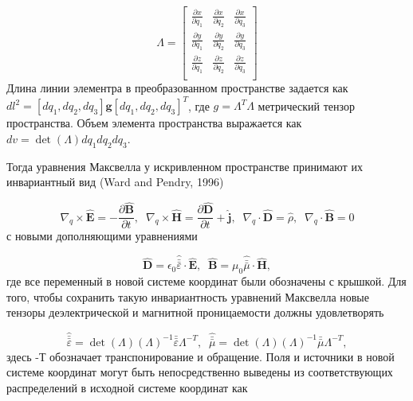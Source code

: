 \documentclass[12pt,a4paper]{article}
\begin{document}
\begin{equation}\label{e4}
	\Lambda = 
	\begin{bmatrix}
	\frac{\partial x}{\partial q_1} & \frac{\partial x}{\partial q_2} & \frac{\partial x}{\partial q_3}\\
	\frac{\partial y}{\partial q_1} & \frac{\partial y}{\partial q_2} & \frac{\partial y}{\partial q_3}\\
	\frac{\partial z}{\partial q_1} & \frac{\partial z}{\partial q_2} & \frac{\partial z}{\partial q_3}\\
	\end{bmatrix}
\end{equation}
Длина линии элементра в преобразованном пространстве задается как 
$dl^2 = [dq_1, dq_2, dq_3]\mathbf{g}[dq_1, dq_2, dq_3]^T$, где $g = \Lambda^T\Lambda$ метрический тензор
пространства. Объем элемента пространства выражается как $dv = \det(\Lambda)dq_1dq_2dq_3$.

Тогда уравнения Максвелла у искривленном пространстве принимают их инвариантный вид (Ward and Pendry, 
1996)

\begin{equation}\label{e5}
	\nabla_q \times \mathbf{\hat{E}} = -\frac{\partial \mathbf{\hat{B}}}{\partial t}, \;\;
\nabla_q \times \mathbf{\hat{H}} = \frac{\partial \mathbf{\hat{D}}}{\partial t} + \mathbf{\hat{j}}, \;\;
\nabla_q \cdot \mathbf{\hat{D}} = \hat{\rho},\;\;
\nabla_q \cdot \mathbf{\hat{B}} = 0
\end{equation}
с новыми дополняющими уравнениями

\begin{equation}\label{e6}
	\mathbf{\hat{D}} = \epsilon_0 \hat{\bar{\bar{\varepsilon}}} \cdot \mathbf{\hat{E}}, \;\;
	\mathbf{\hat{B}} = \mu_0 \hat{\bar{\bar{\mu}}} \cdot \mathbf{\hat{H}},
\end{equation}
где все переменный в новой системе координат были обозначены с крышкой. Для того, чтобы сохранить
такую инвариантность уравнений Максвелла новые тензоры деэлектрической и магнитной проницаемости 
должны удовлетворять

\begin{equation}\label{e7}
	\hat{\bar{\bar{\varepsilon}}} = \det(\Lambda)(\Lambda)^{-1}\bar{\bar{\varepsilon}} \Lambda^{-T}, \;\;
	\hat{\bar{\bar{\mu}}} = \det(\Lambda)(\Lambda)^{-1}\bar{\bar{\mu}} \Lambda^{-T},
\end{equation}
здесь -Т обозначает транспонирование и обращение. Поля и источники в новой системе координат могут быть
непосредственно выведены из соответствующих распределений в исходной системе координат как
\end{document}
